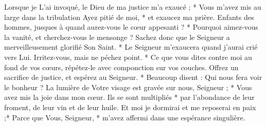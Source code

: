 Lorsque je L'ai invoqué, le Dieu de ma justice m'a exaucé ; * Vous m'avez mis au large dans la tribulation
\versseparator
 Ayez pitié de moi, * et exaucez ma prière.
\versseparator
 Enfants des hommes, jusques à quand aurez-vous le cœur appesanti ? * Pourquoi aimez-vous la vanité, et cherchez-vous le mensonge ?
\versseparator
 Sachez donc que le Seigneur a merveilleusement glorifié Son Saint. * Le Seigneur m'exaucera quand j'aurai crié vers Lui.
\versseparator
 Irritez-vous, mais ne péchez point. * Ce que vous dites contre moi au fond de vos cœurs, répétez-le avec componction sur vos couches.
\versseparator
 Offrez un sacrifice de justice, et espérez au Seigneur. * Beaucoup disent : Qui nous fera voir le bonheur ?
\versseparator
 La lumière de Votre visage est gravée sur nous, Seigneur ; * Vous avez mis la joie dans mon cœur.
\versseparator
 Ils se sont multipliés * par l'abondance de leur froment, de leur vin et de leur huile.
\versseparator
 Et moi je dormirai et me reposerai en paix ;*
\versseparator
 Parce que Vous, Seigneur, * m'avez affermi dans une espérance singulière.